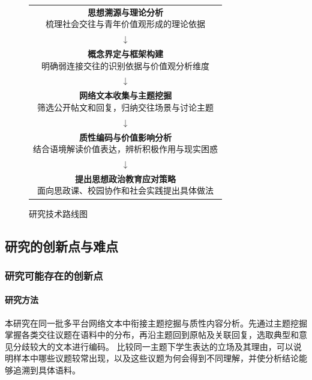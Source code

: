 \begin{figure}[htbp]
  \centering
  \small
  \renewcommand{\thefigure}{\arabic{figure}}
  \setlength{\fboxsep}{5pt}
  \begin{tabular}{@{}c@{}}
    \fbox{\parbox{0.8\linewidth}{\centering\textbf{思想溯源与理论分析}\\梳理社会交往与青年价值观形成的理论依据}} \\
    \(\downarrow\) \\
    \fbox{\parbox{0.8\linewidth}{\centering\textbf{概念界定与框架构建}\\明确弱连接交往的识别依据与价值观分析维度}} \\
    \(\downarrow\) \\
    \fbox{\parbox{0.8\linewidth}{\centering\textbf{网络文本收集与主题挖掘}\\筛选公开帖文和回复，归纳交往场景与讨论主题}} \\
    \(\downarrow\) \\
    \fbox{\parbox{0.8\linewidth}{\centering\textbf{质性编码与价值影响分析}\\结合语境解读价值表达，辨析积极作用与现实困惑}} \\
    \(\downarrow\) \\
    \fbox{\parbox{0.8\linewidth}{\centering\textbf{提出思想政治教育应对策略}\\面向思政课、校园协作和社会实践提出具体做法}}
  \end{tabular}
  \caption{研究技术路线图}
  \label{fig:research-roadmap}
\end{figure}

\subsection{研究的创新点与难点}

\subsubsection{研究可能存在的创新点}

\paragraph{研究方法}
本研究在同一批多平台网络文本中衔接主题挖掘与质性内容分析。先通过主题挖掘掌握各类交往议题在语料中的分布，再沿主题回到原帖及关联回复，选取典型和意见分歧较大的文本进行编码。
比较同一主题下学生表达的立场及其理由，可以说明样本中哪些议题较常出现，以及这些议题为何会得到不同理解，并使分析结论能够追溯到具体语料。

